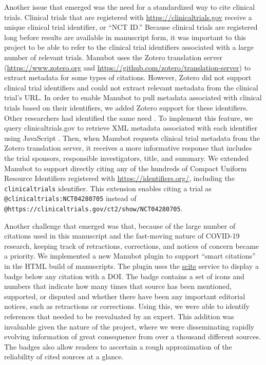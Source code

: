\documentclass[twocolumn]{ceurart}
\begin{document}
Another issue that emerged was the need for a standardized way to cite clinical trials.
Clinical trials that are registered with \url{https://clinicaltrials.gov} receive a unique clinical trial identifier, or ``NCT ID.''
Because clinical trials are registered long before results are available in manuscript form, it was important to this project to be able to refer to the clinical trial identifiers associated with a large number of relevant trials.
Manubot uses the Zotero translation server (\url{https://www.zotero.org} and \url{https://github.com/zotero/translation-server}) to extract metadata for some types of citations.
However, Zotero did not support clinical trial identifiers and could not extract relevant metadata from the clinical trial's URL.
In order to enable Manubot to pull metadata associated with clinical trials based on their identifiers, we added Zotero support for these identifiers.
Other researchers had identified the same need \citep{ZQPtEdnO, thdq2nGf}.
To implement this feature, we query clinicaltrials.gov to retrieve XML metadata associated with each identifier using JavaScript \citep{Bxfd7L4s}.
Then, when Manubot requests clinical trial metadata from the Zotero translation server, it receives a more informative response that includes the trial sponsors, responsible investigators, title, and summary.
We extended Manubot to support directly citing any of the hundreds of Compact Uniform Resource Identifiers registered with \url{https://identifiers.org/}, including the \texttt{clinicaltrials} identifier.
This extension enables citing a trial as \texttt{@clinicaltrials:NCT04280705} instead of \texttt{@https://clinicaltrials.gov/ct2/show/NCT04280705}.

Another challenge that emerged was that, because of the large number of citations used in this manuscript and the fast-moving nature of COVID-19 research, keeping track of retractions, corrections, and notices of concern became a priority.
We implemented a new Manubot plugin to support ``smart citations'' in the HTML build of manuscripts.
The plugin uses the \href{https://scite.ai/}{scite} \citep{14UJbLWf4} service to display a badge below any citation with a DOI.
The badge contains a set of icons and numbers that indicate how many times that source has been mentioned, supported, or disputed and whether there have been any important editorial notices, such as retractions or corrections.
Using this, we were able to identify references that needed to be reevaluated by an expert.
This addition was invaluable given the nature of the project, where we were disseminating rapidly evolving information of great consequence from over a thousand different sources.
The badges also allow readers to ascertain a rough approximation of the reliability of cited sources at a glance.
\end{document}
